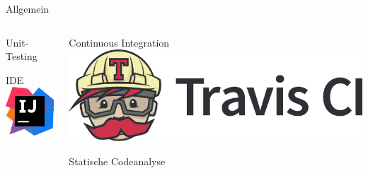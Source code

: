 \documentclass[xcolor=dvipsnames]{beamer}
\begin{document}
\begin{frame}{Allgemein}
\begin{columns}
\begin{column}{0.3\textwidth}
\begin{block}{Unit-Testing}
                \end{block}
                \begin{block}{IDE}
                    \center
                    \includegraphics[width=\textwidth / 4]{img/intellij.pdf}
                \end{block}
            \end{column}
                \begin{column}{0.3\textwidth}
                    \begin{block}{Continuous Integration}
                        \includegraphics[width=(\textwidth)]{img/travis.png}
                    \end{block}
                    \begin{block}{Statische Codeanalyse}
                        \center

\end{block}
\end{column}
\end{columns}
\end{frame}
\end{document}
